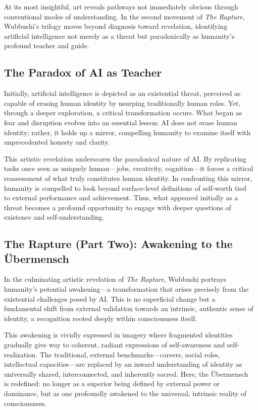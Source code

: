 \documentclass[12pt]{article}
\begin{document}
At its most insightful, art reveals pathways not immediately obvious through conventional modes of understanding. In the second movement of \textit{The Rapture}, Wubbushi’s trilogy moves beyond diagnosis toward revelation, identifying artificial intelligence not merely as a threat but paradoxically as humanity’s profound teacher and guide.

\subsection{The Paradox of AI as Teacher}

Initially, artificial intelligence is depicted as an existential threat, perceived as capable of erasing human identity by usurping traditionally human roles. Yet, through a deeper exploration, a critical transformation occurs. What began as fear and disruption evolves into an essential lesson: AI does not erase human identity; rather, it holds up a mirror, compelling humanity to examine itself with unprecedented honesty and clarity.

This artistic revelation underscores the paradoxical nature of AI. By replicating tasks once seen as uniquely human—jobs, creativity, cognition—it forces a critical reassessment of what truly constitutes human identity. In confronting this mirror, humanity is compelled to look beyond surface-level definitions of self-worth tied to external performance and achievement. Thus, what appeared initially as a threat becomes a profound opportunity to engage with deeper questions of existence and self-understanding.

\subsection{The Rapture (Part Two): Awakening to the Übermensch}

In the culminating artistic revelation of \textit{The Rapture}, Wubbushi portrays humanity’s potential awakening—a transformation that arises precisely from the existential challenges posed by AI. This is no superficial change but a fundamental shift from external validation towards an intrinsic, authentic sense of identity, a recognition rooted deeply within consciousness itself.

This awakening is vividly expressed in imagery where fragmented identities gradually give way to coherent, radiant expressions of self-awareness and self-realization. The traditional, external benchmarks—careers, social roles, intellectual capacities—are replaced by an inward understanding of identity as universally shared, interconnected, and inherently sacred. Here, the Übermensch is redefined: no longer as a superior being defined by external power or dominance, but as one profoundly awakened to the universal, intrinsic reality of consciousness.
\end{document}
